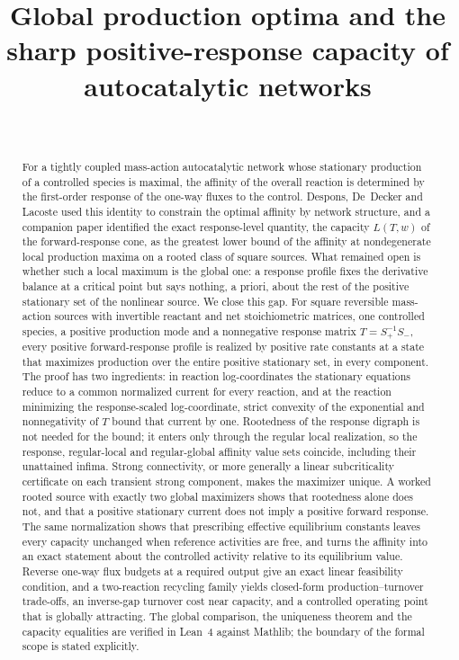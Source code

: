 \documentclass[11pt,a4paper]{article}
\title{Global production optima and the sharp positive-response capacity of autocatalytic networks}
\author{\PaperAuthor\\ \small \PaperAffiliation}
\date{\PaperDate}
\theoremstyle{plain}
\theoremstyle{definition}
\theoremstyle{remark}
\numberwithin{equation}{section}
\newcommand{\Sp}{S_{+}}
\newcommand{\Sm}{S_{-}}
\begin{document}
\maketitle

\begin{abstract}
For a tightly coupled mass-action autocatalytic network whose stationary production of a controlled species is maximal, the affinity of the overall reaction is determined by the first-order response of the one-way fluxes to the control. Despons, De~Decker and Lacoste used this identity to constrain the optimal affinity by network structure, and a companion paper identified the exact response-level quantity, the capacity $L(T,w)$ of the forward-response cone, as the greatest lower bound of the affinity at nondegenerate local production maxima on a rooted class of square sources. What remained open is whether such a local maximum is the global one: a response profile fixes the derivative balance at a critical point but says nothing, a priori, about the rest of the positive stationary set of the nonlinear source. We close this gap. For square reversible mass-action sources with invertible reactant and net stoichiometric matrices, one controlled species, a positive production mode and a nonnegative response matrix $T=\Sp^{-1}\Sm$, every positive forward-response profile is realized by positive rate constants at a state that maximizes production over the entire positive stationary set, in every component. The proof has two ingredients: in reaction log-coordinates the stationary equations reduce to a common normalized current for every reaction, and at the reaction minimizing the response-scaled log-coordinate, strict convexity of the exponential and nonnegativity of $T$ bound that current by one. Rootedness of the response digraph is not needed for the bound; it enters only through the regular local realization, so the response, regular-local and regular-global affinity value sets coincide, including their unattained infima. Strong connectivity, or more generally a linear subcriticality certificate on each transient strong component, makes the maximizer unique. A worked rooted source with exactly two global maximizers shows that rootedness alone does not, and that a positive stationary current does not imply a positive forward response. The same normalization shows that prescribing effective equilibrium constants leaves every capacity unchanged when reference activities are free, and turns the affinity into an exact statement about the controlled activity relative to its equilibrium value. Reverse one-way flux budgets at a required output give an exact linear feasibility condition, and a two-reaction recycling family yields closed-form production--turnover trade-offs, an inverse-gap turnover cost near capacity, and a controlled operating point that is globally attracting. The global comparison, the uniqueness theorem and the capacity equalities are verified in Lean~4 against Mathlib; the boundary of the formal scope is stated explicitly.
\end{abstract}
\end{document}
